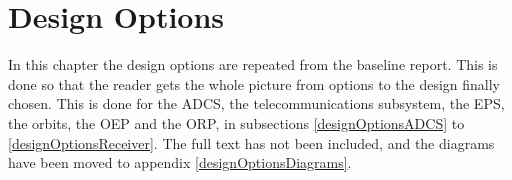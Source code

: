 \chapter{Design Options}
\label{designOptions}

In this chapter the design options are repeated from the baseline report. This is done so that the reader gets the whole picture from options to the design finally chosen. This is done for the \ac{ADCS}, the telecommunications subsystem, the \ac{EPS}, the orbits, the \ac{OEP} and the \ac{ORP}, in subsections \ref{designOptionsADCS} to \ref{designOptionsReceiver}. The full text has not been included, and the diagrams have been moved to appendix \ref{designOptionsDiagrams}.

